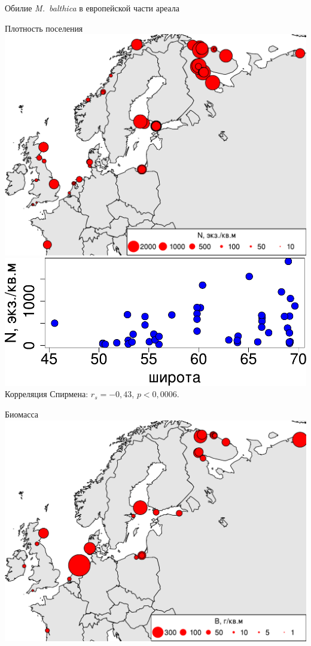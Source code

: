 \documentclass{beamer}
\begin{document}
\begin{frame}{Обилие {\it M.~balthica} в европейской части ареала}
	\begin{minipage}[t]{.49\linewidth}
		\begin{center}
		{\footnotesize Плотность поселения}
			\includegraphics[width=\textwidth]{Nmean_ru1.pdf}\\[1ex]
			\includegraphics[width=\textwidth]{lat_vs_Nmean_big1.pdf}\\
{\small Корреляция Спирмена: $r_{s} = -0,43$, $p < 0,0006$.}
		\end{center}
	\end{minipage}
%
	\begin{minipage}[t]{.49\linewidth}
		\begin{center}
		{\footnotesize Биомасса}
			\includegraphics[width=\textwidth]{Bmean_ru1.pdf}\\[1ex]

\end{center}
\end{minipage}
\end{frame}
\end{document}
